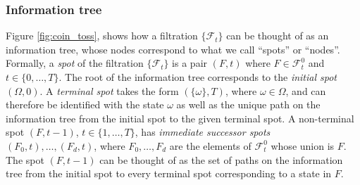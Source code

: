 \documentclass[\topdir/lecture\_notes.tex]{subfiles}
\begin{document}
\subsubsection*{Information tree}
Figure \ref{fig:coin_toss}, shows how a filtration $\{\mathcal{F}_{t}\}$ can be thought of as an information tree, whose nodes correspond to what we call ``spots'' or ``nodes''. Formally, a \emph{spot} of the filtration $\{\mathcal{F}_{t}\}$ is a pair $(F, t)$ where $F \in \mathcal{F}_{t}^{0}$ and $t \in\{0, \ldots, T\}$. The root of the information tree corresponds to the \emph{initial spot} $(\Omega, 0)$. A \emph{terminal spot} takes the form $(\{\omega\}, T)$, where $\omega \in \Omega$, and can therefore be identified with the state $\omega$ as well as the unique path on the information tree from the initial spot to the given terminal spot. A non-terminal spot $(F, t-1)$, $t \in\{1, \ldots, T\}$, has \emph{immediate successor spots} $(F_{0}, t), \ldots,(F_{d}, t)$, where $F_{0}, \ldots, F_{d}$ are the elements of $\mathcal{F}_{t}^{0}$ whose union is $F$. The spot $(F, t-1)$ can be thought of as the set of paths on the information tree from the initial spot to every terminal spot corresponding to a state in $F$.
\end{document}
